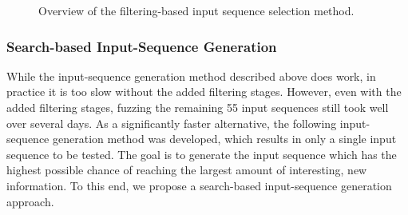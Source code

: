 \begin{figure}
\begin{centering}
\caption{Overview of the filtering-based input sequence selection method.}
\label{fig:fuzz_filtering}
\end{centering}
\end{figure}

\subsubsection{Search-based Input-Sequence Generation} \label{subsubsec:search}
While the input-sequence generation method described above does work, in practice it is too slow without the added filtering stages. However, even with the added filtering stages, fuzzing the remaining 55 input sequences still took well over several days. As a significantly faster alternative, the following input-sequence generation method was developed, which results in only a single input sequence to be tested. The goal is to generate the input sequence which has the highest possible chance of reaching the largest amount of interesting, new information. To this end, we propose a search-based input-sequence generation approach. 
\newpage

